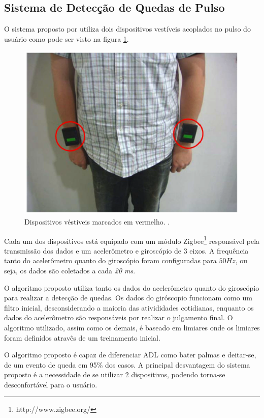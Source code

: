\subsection{Sistema de Detecção de Quedas de Pulso}
O sistema proposto por \cite{hsieh2014wrist} utiliza dois dispositivos vestíveis acoplados no pulso do usuário como pode ser visto na figura \ref{fig:wrist_worn}. 


\begin{figure}[ht]
	\centering
	\includegraphics[scale=0.4]{imagens/wrist_worn.png}
	\caption{ Dispositivos véstiveis marcados em vermelho. \cite{hsieh2014wrist}.}
	\label{fig:wrist_worn}
\end{figure} 


Cada um dos dispositivos está equipado com um módulo Zigbee\footnote{http://www.zigbee.org/} responsável pela transmissão dos dados e  um acelerômetro e  giroscópio de 3 eixos. A frequência tanto do acelerômetro quanto do giroscópio foram configuradas para $50 Hz$, ou seja, os dados são coletados a cada \textit{20 ms}.


O algoritmo proposto utiliza tanto os dados do acelerômetro quanto do giroscópio para realizar a detecção de quedas. Os dados do giróscopio funcionam como um filtro inicial, desconsiderando a maioria das ativididades cotidianas, enquanto os dados do acelerômetro são responsáveis por realizar o julgamento final. O algoritmo utilizado, assim como os demais, é baseado em limiares onde os limiares foram definidos atravês de um treinamento inicial. 

O algoritmo proposto é capaz de diferenciar \ac{ADL} como bater palmas e deitar-se, de um evento de queda em 95\% dos casos. A principal desvantagem do sistema proposto é a necessidade de se utilizar 2 dispositivos, podendo torna-se desconfortável para o usuário.







